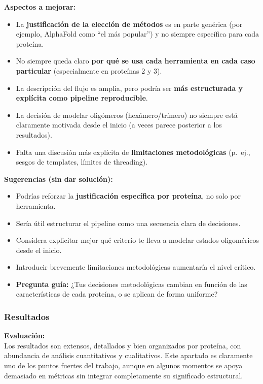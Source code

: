 \documentclass[
  11pt,
  a4paper,
  twoside]{scrreprt}
\begin{document}
\textbf{Aspectos a mejorar:}

\begin{itemize}
\item
  La \textbf{justificación de la elección de métodos} es en parte
  genérica (por ejemplo, AlphaFold como ``el más popular'') y no siempre
  específica para cada proteína.
\item
  No siempre queda claro \textbf{por qué se usa cada herramienta en cada
  caso particular} (especialmente en proteínas 2 y 3).
\item
  La descripción del flujo es amplia, pero podría ser \textbf{más
  estructurada y explícita como pipeline reproducible}.
\item
  La decisión de modelar oligómeros (hexámero/trímero) no siempre está
  claramente motivada desde el inicio (a veces parece posterior a los
  resultados).
\item
  Falta una discusión más explícita de \textbf{limitaciones
  metodológicas} (p.~ej., sesgos de templates, límites de threading).
\end{itemize}

\textbf{Sugerencias (sin dar solución):}

\begin{itemize}
\item
  Podrías reforzar la \textbf{justificación específica por proteína}, no
  solo por herramienta.
\item
  Sería útil estructurar el pipeline como una secuencia clara de
  decisiones.
\item
  Considera explicitar mejor qué criterio te lleva a modelar estados
  oligoméricos desde el inicio.
\item
  Introducir brevemente limitaciones metodológicas aumentaría el nivel
  crítico.
\item
  \textbf{Pregunta guía:} ¿Tus decisiones metodológicas cambian en
  función de las características de cada proteína, o se aplican de forma
  uniforme?
\end{itemize}

\subsubsection{Resultados}\label{resultados}

\textbf{Evaluación:}\\
Los resultados son extensos, detallados y bien organizados por proteína,
con abundancia de análisis cuantitativos y cualitativos. Este apartado
es claramente uno de los puntos fuertes del trabajo, aunque en algunos
momentos se apoya demasiado en métricas sin integrar completamente su
significado estructural.
\end{document}
